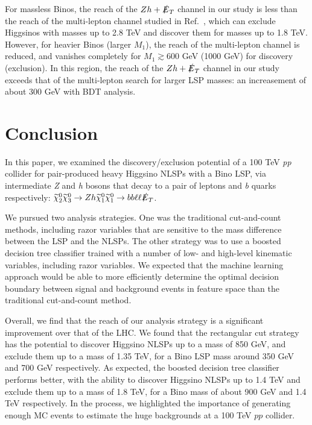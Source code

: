 \documentclass[a4paper,11pt]{article}
\newcommand{\N}{\widetilde{\chi}^0}
\newcommand{\met}{{\slashed{E}_T}}
\begin{document}
For massless Binos, the reach of the $Zh+\met$ channel in our study is less than the reach of the multi-lepton channel studied in Ref.~\cite{Gori:2014oua},
which can exclude Higgsinos with masses up to 2.8 TeV and discover them for masses 
up to 1.8 TeV.
However, for heavier Binos (larger $M_1$), the reach of the multi-lepton channel
is reduced, and vanishes completely for $M_1\gtrsim 600$ GeV (1000 GeV)
for discovery (exclusion). In this region, the reach of the $Zh+\met$ channel in our study exceeds that of the multi-lepton search for larger LSP masses: an increasement of about 300 GeV with BDT analysis.  


\section{Conclusion}\label{sec:conclusion}

In this paper, we examined the discovery/exclusion potential of a 100 TeV \emph{pp} collider
for pair-produced heavy Higgsino NLSPs with a Bino LSP, via intermediate \emph{Z} and
\emph{h} bosons that decay to a pair of leptons and \emph{b} quarks respectively:
$\N_2\N_3\rightarrow Zh \N_1\N_1\rightarrow bb\ell\ell \met$.

We pursued two analysis strategies. One was the traditional cut-and-count methods, including razor variables
that are sensitive to the mass difference between the LSP and the NLSPs. The
other strategy was to use a boosted decision tree classifier trained with a
number of low- and high-level kinematic variables, including razor variables. We expected
that the machine learning approach would be able to more efficiently determine
the optimal decision boundary between signal and background events in feature
space than the traditional   cut-and-count method.

Overall, we find that the reach of our analysis strategy is a significant
improvement over that of the LHC. We found that the rectangular cut strategy has
the potential to discover Higgsino NLSPs up to a mass of 850 GeV, and exclude
them up to a mass of 1.35 TeV, for a Bino LSP mass around 350 GeV and 700 GeV
respectively. 
As expected, the boosted decision tree classifier
performs better, with the ability to discover Higgsino NLSPs up to 1.4 TeV and
exclude them up to a mass of 1.8 TeV, for a Bino mass of about 900 GeV and 1.4
TeV respectively.   In the
process, we highlighted the importance of generating enough MC  events
to estimate the huge backgrounds at a 100 TeV $pp$ collider.   
\end{document}
